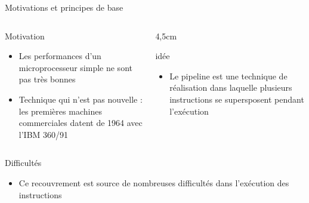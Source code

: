 %
\begin{Frame}{Motivations et principes de base}
  \begin{columns}[t]
    \begin{column}{7cm} %
      \begin{block}{Motivation}
        \begin{itemize}
        \item Les performances d'un microprocesseur simple ne sont pas très bonnes
	\item Technique qui n'est pas nouvelle : les premières machines commerciales datent de 1964 avec l'IBM 360/91
        \end{itemize}
      \end{block} 
    \end{column}
    
    \begin{column}{4,5cm} %
      \begin{block}{idée}
\begin{itemize}
        \item Le pipeline est une technique de réalisation dans laquelle plusieurs instructions se supersposent pendant l'exécution
        \end{itemize}
      \end{block}   
    \end{column}
  \end{columns}  

\begin{block}{Difficultés}
       \begin{center}
 	\begin{itemize}
         \item Ce recouvrement est source de nombreuses difficultés dans l'exécution des instructions
        \end{itemize}
       \end{center}
      \end{block}   

\end{Frame}


